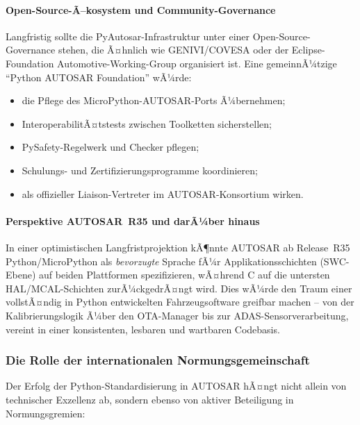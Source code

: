 ﻿\documentclass[12pt,a4paper,twoside]{article}
\begin{document}
\paragraph{Open-Source-Ã–kosystem und Community-Governance}
Langfristig sollte die PyAu\-tosar-Infrastruktur unter einer
Open-Source-Governance stehen, die Ã¤hnlich wie GENIVI/COVESA
oder der Eclipse-Foundation Automotive-Working-Group organisiert ist.
Eine gemeinnÃ¼tzige ``Python AUTOSAR Foundation'' wÃ¼rde:
\begin{itemize}
  \item die Pflege des MicroPython-AUTOSAR-Ports Ã¼bernehmen;
  \item InteroperabilitÃ¤tstests zwischen Toolketten sicherstellen;
  \item PySafety-Regelwerk und Checker pflegen;
  \item Schulungs- und Zertifizierungsprogramme koordinieren;
  \item als offizieller Liaison-Vertreter im AUTOSAR-Konsortium wirken.
\end{itemize}

\paragraph{Perspektive AUTOSAR~R35 und darÃ¼ber hinaus}
In einer optimistischen Langfristprojektion kÃ¶nnte AUTOSAR ab Release~R35
Python/MicroPython als \emph{bevorzugte} Sprache fÃ¼r Applikationsschichten
(SWC-Ebene) auf beiden Plattformen spezifizieren, wÃ¤hrend C
auf die untersten HAL/MCAL-Schichten zurÃ¼ckgedrÃ¤ngt wird.
Dies wÃ¼rde den Traum einer vollstÃ¤ndig in Python entwickelten
Fahrzeugsoftware greifbar machen -- von der Kalibrierungslogik Ã¼ber
den OTA-Manager bis zur ADAS-Sensorverarbeitung, vereint in einer
konsistenten, lesbaren und wartbaren Codebasis.

\subsubsection{Die Rolle der internationalen Normungsgemeinschaft}

Der Erfolg der Python-Standardisierung in AUTOSAR hÃ¤ngt nicht allein
von technischer Exzellenz ab, sondern ebenso von aktiver Beteiligung
in Normungsgremien:
\end{document}
